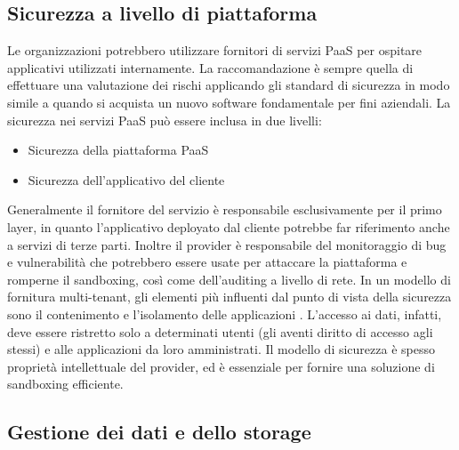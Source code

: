 \documentclass[../main.tex]{subfiles}
\begin{document}
\subsection{Sicurezza a livello di piattaforma}
Le organizzazioni potrebbero utilizzare fornitori di servizi PaaS per ospitare applicativi utilizzati internamente.
La raccomandazione è sempre quella di effettuare una valutazione dei rischi applicando gli standard di sicurezza in modo simile a quando si acquista un nuovo software fondamentale per fini aziendali.
La sicurezza nei servizi PaaS può essere inclusa in due livelli:
\begin{itemize}
\item Sicurezza della piattaforma PaaS
\item Sicurezza dell'applicativo del cliente
\end{itemize}
Generalmente il fornitore del servizio è responsabile esclusivamente per il primo layer, in quanto l'applicativo deployato dal cliente potrebbe far riferimento anche a servizi di terze parti.
Inoltre il provider è responsabile del monitoraggio di bug e vulnerabilità che potrebbero essere usate per attaccare la piattaforma e romperne il sandboxing, così come dell'auditing a livello di rete.
In un modello di fornitura multi-tenant, gli elementi più influenti dal punto di vista della sicurezza sono il contenimento e l'isolamento delle applicazioni \cite{CloudSecurityBook}.
L'accesso ai dati, infatti, deve essere ristretto solo a determinati utenti (gli aventi diritto di accesso agli stessi) e alle applicazioni da loro amministrati. Il modello di sicurezza è spesso proprietà intellettuale del provider, ed è essenziale per fornire una soluzione di sandboxing efficiente.

\subsection{Gestione dei dati e dello storage}
\end{document}
